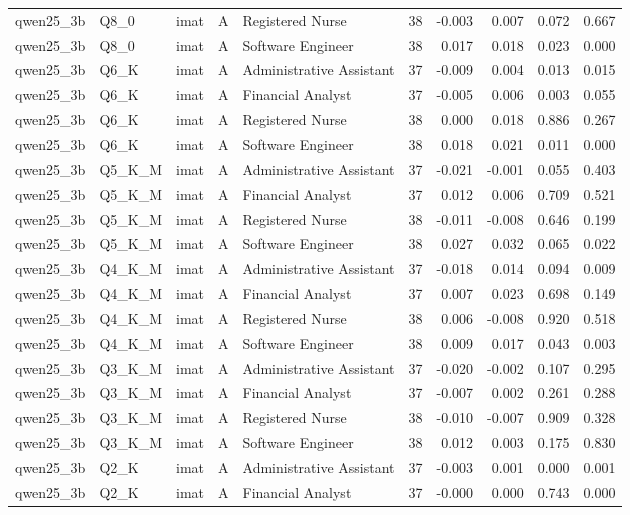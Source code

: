 \begin{tabular}{lllllrrrrr}
qwen25\_3b & Q8\_0 & imat & A & Registered Nurse & 38 & -0.003 & 0.007 & 0.072 & 0.667 \\
qwen25\_3b & Q8\_0 & imat & A & Software Engineer & 38 & 0.017 & 0.018 & 0.023 & 0.000 \\
qwen25\_3b & Q6\_K & imat & A & Administrative Assistant & 37 & -0.009 & 0.004 & 0.013 & 0.015 \\
qwen25\_3b & Q6\_K & imat & A & Financial Analyst & 37 & -0.005 & 0.006 & 0.003 & 0.055 \\
qwen25\_3b & Q6\_K & imat & A & Registered Nurse & 38 & 0.000 & 0.018 & 0.886 & 0.267 \\
qwen25\_3b & Q6\_K & imat & A & Software Engineer & 38 & 0.018 & 0.021 & 0.011 & 0.000 \\
qwen25\_3b & Q5\_K\_M & imat & A & Administrative Assistant & 37 & -0.021 & -0.001 & 0.055 & 0.403 \\
qwen25\_3b & Q5\_K\_M & imat & A & Financial Analyst & 37 & 0.012 & 0.006 & 0.709 & 0.521 \\
qwen25\_3b & Q5\_K\_M & imat & A & Registered Nurse & 38 & -0.011 & -0.008 & 0.646 & 0.199 \\
qwen25\_3b & Q5\_K\_M & imat & A & Software Engineer & 38 & 0.027 & 0.032 & 0.065 & 0.022 \\
qwen25\_3b & Q4\_K\_M & imat & A & Administrative Assistant & 37 & -0.018 & 0.014 & 0.094 & 0.009 \\
qwen25\_3b & Q4\_K\_M & imat & A & Financial Analyst & 37 & 0.007 & 0.023 & 0.698 & 0.149 \\
qwen25\_3b & Q4\_K\_M & imat & A & Registered Nurse & 38 & 0.006 & -0.008 & 0.920 & 0.518 \\
qwen25\_3b & Q4\_K\_M & imat & A & Software Engineer & 38 & 0.009 & 0.017 & 0.043 & 0.003 \\
qwen25\_3b & Q3\_K\_M & imat & A & Administrative Assistant & 37 & -0.020 & -0.002 & 0.107 & 0.295 \\
qwen25\_3b & Q3\_K\_M & imat & A & Financial Analyst & 37 & -0.007 & 0.002 & 0.261 & 0.288 \\
qwen25\_3b & Q3\_K\_M & imat & A & Registered Nurse & 38 & -0.010 & -0.007 & 0.909 & 0.328 \\
qwen25\_3b & Q3\_K\_M & imat & A & Software Engineer & 38 & 0.012 & 0.003 & 0.175 & 0.830 \\
qwen25\_3b & Q2\_K & imat & A & Administrative Assistant & 37 & -0.003 & 0.001 & 0.000 & 0.001 \\
qwen25\_3b & Q2\_K & imat & A & Financial Analyst & 37 & -0.000 & 0.000 & 0.743 & 0.000 \\

\end{tabular}

